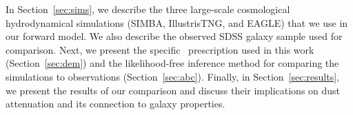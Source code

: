 In Section~\ref{sec:sims}, we describe the three large-scale cosmological
hydrodynamical simulations (SIMBA, IllustrisTNG, and EAGLE) that we use in
our forward model.
We also describe the observed SDSS galaxy sample used for comparison. 
Next, we present the specific \eda~prescription used in this work
(Section~\ref{sec:dem}) and the likelihood-free inference method for
comparing the simulations to observations (Section~\ref{sec:abc}). 
Finally, in Section~\ref{sec:results}, we present the results of our
comparison and discuss their implications on dust attenuation and its
connection to galaxy properties. 



%
    

